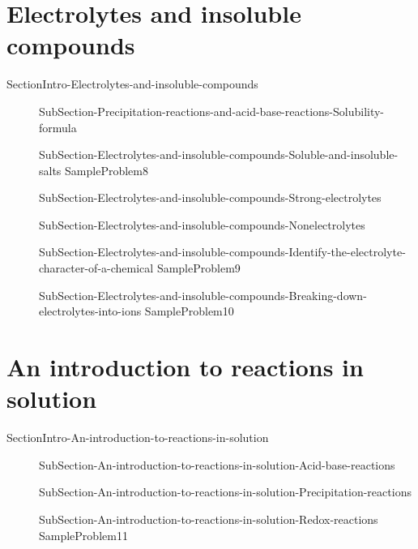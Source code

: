 \documentclass[main.tex]{subfiles} %
\begin{document}
\section{Electrolytes and insoluble compounds}{SectionIntro-Electrolytes-and-insoluble-compounds}
\sloppy \begin{description}
\item[] {SubSection-Precipitation-reactions-and-acid-base-reactions-Solubility-formula}
\item[] {SubSection-Electrolytes-and-insoluble-compounds-Soluble-and-insoluble-salts}
{SampleProblem8}
\vspace{0cm}{Table-Solubility}
\item[]{SubSection-Electrolytes-and-insoluble-compounds-Strong-electrolytes}
\item[]{SubSection-Electrolytes-and-insoluble-compounds-Nonelectrolytes}
\item[]{SubSection-Electrolytes-and-insoluble-compounds-Identify-the-electrolyte-character-of-a-chemical}
 \vspace{1cm}{Table-Electrolytes	}
 {SampleProblem9}

 	
\item[]{SubSection-Electrolytes-and-insoluble-compounds-Breaking-down-electrolytes-into-ions}
{SampleProblem10}
\end{description}


\section{An introduction to reactions in solution}{SectionIntro-An-introduction-to-reactions-in-solution}
\sloppy \begin{description}
\item[] {SubSection-An-introduction-to-reactions-in-solution-Acid-base-reactions}
\item[]{SubSection-An-introduction-to-reactions-in-solution-Precipitation-reactions}
\item[]{SubSection-An-introduction-to-reactions-in-solution-Redox-reactions}
{SampleProblem11}
\end{description}
\end{document}
